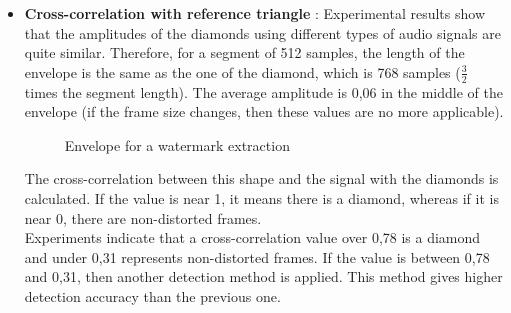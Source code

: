 \begin{itemize}
\item \textbf{Cross-correlation with reference triangle} : Experimental results show that the amplitudes of the diamonds using different types of audio signals are quite similar. Therefore, for a segment of 512 samples, the length of the envelope is the same as the one of the diamond, which is 768 samples ($\frac{3}{2}$ times the segment length). The average amplitude is 0,06 in the middle of the envelope (if the frame size changes, then these values are no more applicable).
\begin{figure}[H]
\caption{\label{envelope} Envelope for a watermark extraction}
\end{figure}
The cross-correlation between this shape and the signal with the diamonds is calculated. If the value is near 1, it means there is a diamond, whereas if it is near 0, there are non-distorted frames.\\
Experiments indicate that a cross-correlation value over 0,78 is a diamond and under 0,31 represents non-distorted frames. If the value is between 0,78 and 0,31, then another detection method is applied. This method gives higher detection accuracy than the previous one.
\end{itemize}

